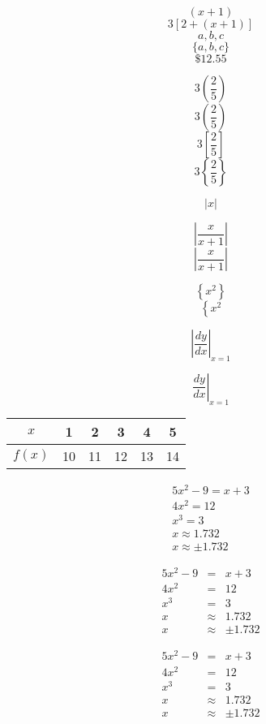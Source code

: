 \documentclass[11pt]{article}
\begin{document}
$$(x+1)$$
$$3[2+(x+1)]$$
$${a,b,c}$$
$$\{a,b,c\}$$
$$\$12.55$$

$$3(\frac{2}{5})$$
$$3\left(\frac{2}{5}\right)$$
$$3\left[\frac{2}{5}\right]$$
$$3\left\{\frac{2}{5}\right\}$$

$$|x|$$

$$|\frac{x}{x+1}|$$
$$\left|\frac{x}{x+1}\right|$$

$$\left\{x^2\right\}$$
$$\left\{x^2\right.$$

$$\left|\frac{dy}{dx}\right|_{x=1}$$

$$\left.\frac{dy}{dx}\right|_{x=1}$$

\begin{tabular}{|c|c|c|c|c|c|}
\hline
$x$ & 1 & 2 & 3 & 4 & 5 \\ \hline
$f(x)$ & 10 & 11 & 12 & 13 & 14 \\ \hline

\end{tabular}

\begin{eqnarray}
5x^2-9=x+3 \\
4x^2=12 \\
x^3=3 \\
x\approx1.732 \\
x\approx\pm1.732
\end{eqnarray}

\begin{eqnarray}
5x^2-9&=&x+3 \\
4x^2&=&12 \\
x^3&=&3 \\
x&\approx&1.732 \\
x&\approx&\pm1.732
\end{eqnarray}

\begin{eqnarray*}
5x^2-9&=&x+3 \\
4x^2&=&12 \\
x^3&=&3 \\
x&\approx&1.732 \\
x&\approx&\pm1.732
\end{eqnarray*}
\end{document}
